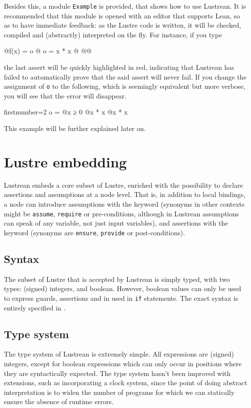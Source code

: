 \documentclass{scrartcl}
\makeatletter
\def\uwave{\bgroup\markoverwith{\lower3.5\p@\hbox{\sixly\textcolor{red!90!black}{\char58}}}\ULon}
\newcommand*{\error}[1]{\uwave{#1}}
\makeatother
\begin{document}
Besides this, a module \texttt{Example} is provided, that shows how to use Lustrean.  It is
recommended that this module is opened with an editor that supports Lean, so as to have immediate
feedback: as the Lustre code is written, it will be checked, compiled and (abstractly)
interpreted on the fly.  For instance, if you type
\begin{lustre}
@\Node@ f(x) = o @\Where@
  o = x * x
@\Assert@
  @\error{o ≥ 0}@
\end{lustre}
the last assert will be quickly highlighted in red, indicating that Lustrean has failed to
automatically prove that the said assert will never fail.  If you change the assignment of
\texttt{o} to the following, which is seemingly equivalent but more verbose, you will see that
the error will disappear.
\begin{lustre*}{firstnumber=2}
  o = @\If@ x ≥ 0 @\Then@ x * x @\Else@ x * x
\end{lustre*}
This example will be further explained later on.


\section{Lustre embedding}
Lustrean embeds a core subset of Lustre, enriched with the possibility to declare assertions and
assumptions at a node level.  That is, in addition to local bindings, a node can introduce
assumptions with the  keyword (synonyms in other contexts might be
\texttt{assume}, \texttt{require} or pre-conditions, although in Lustrean assumptions can speak
of any variable, not just input variables), and assertions with the  keyword
(synonyms are \texttt{ensure}, \texttt{provide} or post-conditions).

\subsection{Syntax}
The subset of Lustre that is accepted by Lustrean is simply typed, with two types: (signed)
integers, and boolean.  However, boolean values can only be used to express guards, assertions
and in used in \texttt{if} statements.  The exact syntax is entirely specified in
.

\subsection{Type system}
The type system of Lustrean is extremely simple.  All expressions are (signed) integers, except
for boolean expressions which can only occur in positions where they are syntactically expected.
The type system hasn't been improved with extensions, such as incorporating a clock system, since
the point of doing abstract interpretation is to widen the number of programs for which we can
statically ensure the absence of runtime errors.
\end{document}
